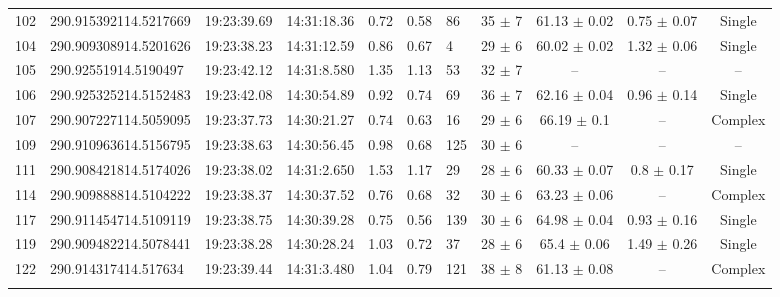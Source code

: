 \documentclass[longauth]{aa} %
\begin{document}
\begin{appendix}
\begin{table}[htbp!]
\begin{tabular}{llllllllccc}
102  &  290.915392114.5217669  &  19:23:39.69  &  14:31:18.36  &  0.72  &  0.58  &  86  &  35 $\pm$ 7  &  61.13 $\pm$ 0.02  &  0.75 $\pm$ 0.07  &  Single \\
104  &  290.909308914.5201626  &  19:23:38.23  &  14:31:12.59  &  0.86  &  0.67  &  4  &  29 $\pm$ 6  &  60.02 $\pm$ 0.02  &  1.32 $\pm$ 0.06  &  Single \\
105  &  290.92551914.5190497  &  19:23:42.12  &  14:31:8.580  &  1.35  &  1.13  &  53  &  32 $\pm$ 7  &  --  &  --  &  -- \\
106  &  290.925325214.5152483  &  19:23:42.08  &  14:30:54.89  &  0.92  &  0.74  &  69  &  36 $\pm$ 7  &  62.16 $\pm$ 0.04  &  0.96 $\pm$ 0.14  &  Single \\
107  &  290.907227114.5059095  &  19:23:37.73  &  14:30:21.27  &  0.74  &  0.63  &  16  &  29 $\pm$ 6  &  66.19 $\pm$ 0.1  &  --  &  Complex \\
109  &  290.910963614.5156795  &  19:23:38.63  &  14:30:56.45  &  0.98  &  0.68  &  125  &  30 $\pm$ 6  &  --  &  --  &  -- \\
111  &  290.908421814.5174026  &  19:23:38.02  &  14:31:2.650  &  1.53  &  1.17  &  29  &  28 $\pm$ 6  &  60.33 $\pm$ 0.07  &  0.8 $\pm$ 0.17  &  Single \\
114  &  290.909888814.5104222  &  19:23:38.37  &  14:30:37.52  &  0.76  &  0.68  &  32  &  30 $\pm$ 6  &  63.23 $\pm$ 0.06  &  --  &  Complex \\
117  &  290.911454714.5109119  &  19:23:38.75  &  14:30:39.28  &  0.75  &  0.56  &  139  &  30 $\pm$ 6  &  64.98 $\pm$ 0.04  &  0.93 $\pm$ 0.16  &  Single \\
119  &  290.909482214.5078441  &  19:23:38.28  &  14:30:28.24  &  1.03  &  0.72  &  37  &  28 $\pm$ 6  &  65.4 $\pm$ 0.06  &  1.49 $\pm$ 0.26  &  Single \\
122  &  290.914317414.517634  &  19:23:39.44  &  14:31:3.480  &  1.04  &  0.79  &  121  &  38 $\pm$ 8  &  61.13 $\pm$ 0.08  &  --  &  Complex \\
\hline \noalign {\smallskip}
\end{tabular}
\end{table}


\end{appendix}
\end{document}
